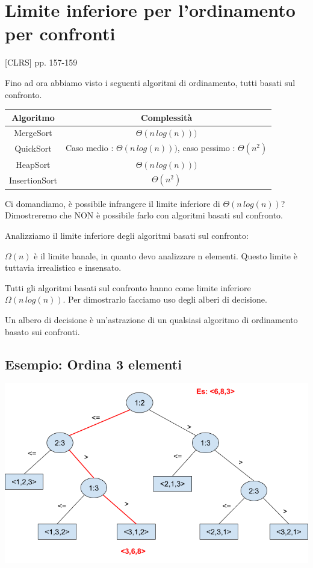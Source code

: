 \section{Limite inferiore per l'ordinamento per confronti}

{{[}CLRS{]} pp. 157-159}

{Fino ad ora abbiamo visto i seguenti algoritmi di ordinamento, tutti basati sul confronto.}

\begin{tabular}{|c|c|}
\hline
Algoritmo & Complessità \\
\hline
MergeSort & $\Theta(n\,log(n)))$ \\
\hline
QuickSort & Caso medio : $\Theta(n\,log(n)))$, caso pessimo : $\Theta(n^2)$ \\
\hline
HeapSort & $\Theta(n\,log(n)))$ \\
\hline
InsertionSort & $\Theta(n^2)$ \\
\hline
\end{tabular}

{Ci domandiamo, è possibile infrangere il limite inferiore di $\Theta(n\,log(n))$? Dimostreremo che NON è possibile farlo con algoritmi basati sul confronto.}

{Analizziamo il limite inferiore degli algoritmi basati sul confronto:}

{$\Omega(n)$ è il limite banale, in quanto devo analizzare n elementi. Questo limite è tuttavia irrealistico e insensato.}

{Tutti gli algoritmi basati sul confronto hanno come limite inferiore $\Omega(n\,log(n))$. Per dimostrarlo facciamo uso degli alberi di decisione.}

{Un albero di decisione è un'astrazione di un qualsiasi algoritmo di ordinamento basato sui confronti.}

\subsection{Esempio: Ordina 3 elementi}

{\includegraphics{images/image531.png}}

